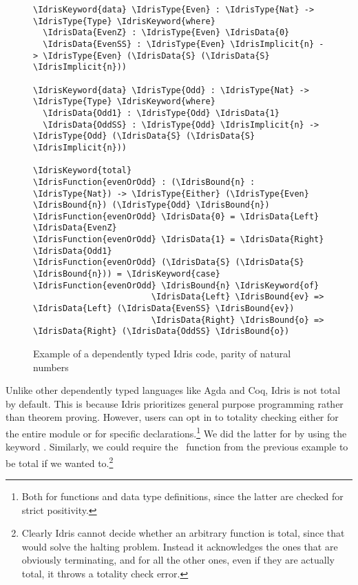 \begin{figure}[ht]
\caption{Example of a dependently typed Idris code, parity of natural numbers}
\label{code:evenodd}
\begin{Verbatim}[framesep=2mm, label=\footnotesize{\normalfont{Idris}}, labelposition=topline]
\IdrisKeyword{data} \IdrisType{Even} : \IdrisType{Nat} -> \IdrisType{Type} \IdrisKeyword{where}
  \IdrisData{EvenZ} : \IdrisType{Even} \IdrisData{0}
  \IdrisData{EvenSS} : \IdrisType{Even} \IdrisImplicit{n} -> \IdrisType{Even} (\IdrisData{S} (\IdrisData{S} \IdrisImplicit{n}))

\IdrisKeyword{data} \IdrisType{Odd} : \IdrisType{Nat} -> \IdrisType{Type} \IdrisKeyword{where}
  \IdrisData{Odd1} : \IdrisType{Odd} \IdrisData{1}
  \IdrisData{OddSS} : \IdrisType{Odd} \IdrisImplicit{n} -> \IdrisType{Odd} (\IdrisData{S} (\IdrisData{S} \IdrisImplicit{n}))

\IdrisKeyword{total}
\IdrisFunction{evenOrOdd} : (\IdrisBound{n} : \IdrisType{Nat}) -> \IdrisType{Either} (\IdrisType{Even} \IdrisBound{n}) (\IdrisType{Odd} \IdrisBound{n})
\IdrisFunction{evenOrOdd} \IdrisData{0} = \IdrisData{Left} \IdrisData{EvenZ}
\IdrisFunction{evenOrOdd} \IdrisData{1} = \IdrisData{Right} \IdrisData{Odd1}
\IdrisFunction{evenOrOdd} (\IdrisData{S} (\IdrisData{S} \IdrisBound{n})) = \IdrisKeyword{case} \IdrisFunction{evenOrOdd} \IdrisBound{n} \IdrisKeyword{of}
                        \IdrisData{Left} \IdrisBound{ev} => \IdrisData{Left} (\IdrisData{EvenSS} \IdrisBound{ev})
                        \IdrisData{Right} \IdrisBound{o} => \IdrisData{Right} (\IdrisData{OddSS} \IdrisBound{o})
\end{Verbatim}
\end{figure}

Unlike other dependently typed languages like Agda and Coq, Idris is not total
by default. This is because Idris prioritizes general purpose programming
rather than theorem proving. However, users can opt in to totality
checking either for the entire module or for specific
declarations.\footnote{Both for functions and data type definitions, since the
latter are checked for strict positivity.}
We did the latter for  by using the keyword .
Similarly, we could require the \zip\ function from the previous example to be
total if we wanted to.\footnote{Clearly Idris cannot decide whether an arbitrary
function is total, since that would solve the halting problem. Instead it
acknowledges the ones that are obviously terminating, and for all the other
ones, even if they are actually total, it throws a totality check error.}

